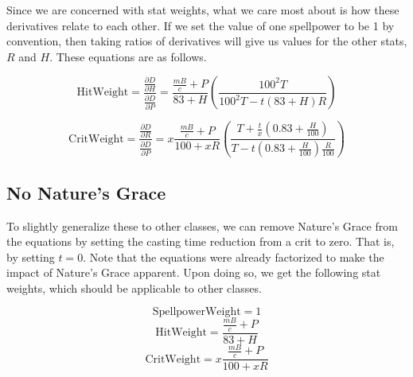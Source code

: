 \documentclass[letterpaper]{article}
\theoremstyle{definition}
\begin{document}
Since we are concerned with stat weights, what we care most about is how these derivatives relate to each other. If we set the value of one spellpower to be 1 by convention, then taking ratios of derivatives will give us values for the other stats, $R$ and $H$. These equations are as follows.

\begin{equation}
\textrm{HitWeight} = \frac{\frac{\partial D}{\partial H}}{\frac{\partial D}{\partial P}} = \frac{\frac{mB}{c} + P}{83 + H} \left(\frac{100^2 T}{100^2T - t(83 + H)R}\right)
\end{equation}

\begin{equation}
\textrm{CritWeight} = \frac{\frac{\partial D}{\partial R}}{\frac{\partial D}{\partial P}} = x\frac{\frac{mB}{c} + P}{100+xR} \left(\frac{T + \frac{t}{x}\left(0.83+\frac{H}{100}\right)}{T - t\left(0.83 + \frac{H}{100}\right)\frac{R}{100}}\right)
\end{equation}

\subsection{No Nature's Grace}
To slightly generalize these to other classes, we can remove Nature's Grace from the equations by setting the casting time reduction from a crit to zero. That is, by setting $t=0$. Note that the equations were already factorized to make the impact of Nature's Grace apparent. Upon doing so, we get the following stat weights, which should be applicable to other classes.

\begin{equation}
\nonumber
\textrm{SpellpowerWeight} = 1
\end{equation}
\begin{equation}
\nonumber
\textrm{HitWeight} = \frac{\frac{mB}{c} + P}{83 + H}
\end{equation}
\begin{equation}
\nonumber
\textrm{CritWeight} = x\frac{\frac{mB}{c} + P}{100 + xR}
\end{equation}
\end{document}
